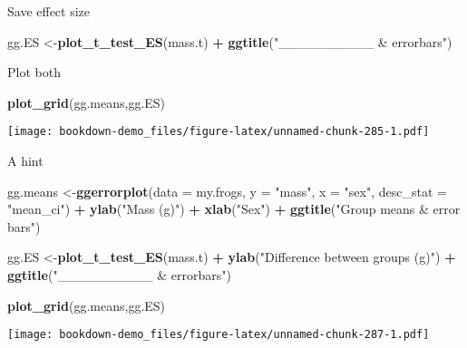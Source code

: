 \documentclass[]{book}
\newenvironment{Shaded}{\begin{snugshade}}{\end{snugshade}}
\newcommand{\KeywordTok}[1]{\textcolor[rgb]{0.13,0.29,0.53}{\textbf{#1}}}
\newcommand{\DataTypeTok}[1]{\textcolor[rgb]{0.13,0.29,0.53}{#1}}
\newcommand{\StringTok}[1]{\textcolor[rgb]{0.31,0.60,0.02}{#1}}
\newcommand{\OperatorTok}[1]{\textcolor[rgb]{0.81,0.36,0.00}{\textbf{#1}}}
\newcommand{\NormalTok}[1]{#1}
\theoremstyle{definition}
\theoremstyle{definition}
\theoremstyle{definition}
\theoremstyle{remark}
\begin{document}
Save effect size

\begin{Shaded}
\begin{Highlighting}[]
\NormalTok{gg.ES <-}\KeywordTok{plot_t_test_ES}\NormalTok{(mass.t) }\OperatorTok{+}
\StringTok{  }\KeywordTok{ggtitle}\NormalTok{(}\StringTok{"__________ & errorbars"}\NormalTok{)}
\end{Highlighting}
\end{Shaded}

Plot both

\begin{Shaded}
\begin{Highlighting}[]
\KeywordTok{plot_grid}\NormalTok{(gg.means,gg.ES)}
\end{Highlighting}
\end{Shaded}

\texttt{[image: bookdown-demo\_files/figure-latex/unnamed-chunk-285-1.pdf]}

A hint

\begin{Shaded}
\begin{Highlighting}[]
\NormalTok{gg.means <-}\KeywordTok{ggerrorplot}\NormalTok{(}\DataTypeTok{data =}\NormalTok{ my.frogs,}
          \DataTypeTok{y =} \StringTok{"mass"}\NormalTok{,}
          \DataTypeTok{x =} \StringTok{"sex"}\NormalTok{,}
          \DataTypeTok{desc_stat =} \StringTok{"mean_ci"}\NormalTok{) }\OperatorTok{+}
\StringTok{  }\KeywordTok{ylab}\NormalTok{(}\StringTok{"Mass (g)"}\NormalTok{) }\OperatorTok{+}
\StringTok{  }\KeywordTok{xlab}\NormalTok{(}\StringTok{"Sex"}\NormalTok{) }\OperatorTok{+}
\StringTok{  }\KeywordTok{ggtitle}\NormalTok{(}\StringTok{"Group means & error bars"}\NormalTok{)}


\NormalTok{gg.ES <-}\KeywordTok{plot_t_test_ES}\NormalTok{(mass.t) }\OperatorTok{+}
\StringTok{  }\KeywordTok{ylab}\NormalTok{(}\StringTok{"Difference between groups (g)"}\NormalTok{) }\OperatorTok{+}
\StringTok{  }\KeywordTok{ggtitle}\NormalTok{(}\StringTok{"__________ & errorbars"}\NormalTok{)}
\end{Highlighting}
\end{Shaded}

\begin{Shaded}
\begin{Highlighting}[]
\KeywordTok{plot_grid}\NormalTok{(gg.means,gg.ES)}
\end{Highlighting}
\end{Shaded}

\texttt{[image: bookdown-demo\_files/figure-latex/unnamed-chunk-287-1.pdf]}
\end{document}
